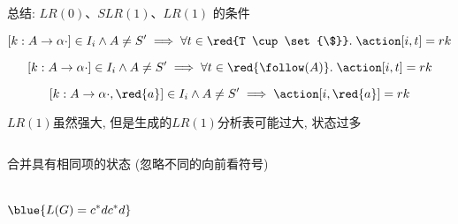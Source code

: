 \begin{frame}{}
  \begin{center}
    总结: $LR(0)$、$SLR(1)$、$LR(1)$ 的条件

    \[
      [k: A \to \alpha \cdot] \in I_{i} \land A \neq S' \implies
        \forall t \in \red{T \cup \set{\$}}.\; \action[i, t] = rk
    \]

    \[
      [k: A \to \alpha \cdot] \in I_{i} \land A \neq S' \implies
        \forall t \in \red{\follow(A)}.\; \action[i, t] = rk
    \]

    \[
      [k: A \to \alpha \cdot, \red{a}] \in I_{i} \land A \neq S' \implies
        \action[i, \red{a}] = rk
    \]
  \end{center}
\end{frame}

\begin{frame}{}
  \begin{center}
    $LR(1)$虽然强大, 但是生成的$LR(1)$分析表可能过大, 状态过多

    \begin{columns}
    \end{columns}

    \pause
    \vspace{0.10cm}
     合并具有相同项的状态 (忽略不同的向前看符号)
  \end{center}
\end{frame}

\begin{frame}{}
  \begin{center}

    \begin{columns}

        \[
          \blue{L(G) = c^{\ast}dc^{\ast}d}
        \]
    \end{columns}

    \vspace{0.20cm}
  \end{center}
\end{frame}

